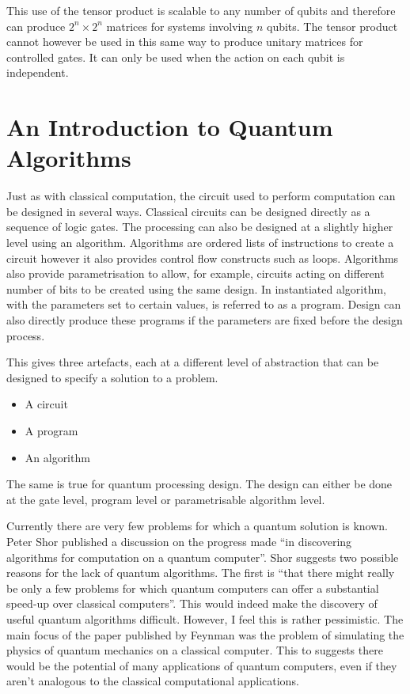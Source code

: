 This use of the tensor product is scalable to any number of qubits and therefore can produce $2^n\times{2^n}$ matrices for systems involving $n$ qubits.
The tensor product cannot however be used in this same way to produce unitary matrices for controlled gates.
It can only be used when the action on each qubit is independent.

\section{An Introduction to Quantum Algorithms}

Just as with classical computation, the circuit used to perform computation can be designed in several ways.
Classical circuits can be designed directly as a sequence of logic gates.
The processing can also be designed at a slightly higher level using an algorithm.
Algorithms are ordered lists of instructions to create a circuit however it also provides control flow constructs such as loops.
Algorithms also provide parametrisation to allow, for example, circuits acting on different number of bits to be created using the same design.
In instantiated algorithm, with the parameters set to certain values, is referred to as a program.
Design can also directly produce these programs if the parameters are fixed before the design process.

This gives three artefacts, each at a different level of abstraction that can be designed to specify a solution to a problem.
\begin{itemize}
 \item A circuit
 \item A program
 \item An algorithm
\end{itemize}

The same is true for quantum processing design.
The design can either be done at the gate level, program level or parametrisable algorithm level.

Currently there are very few problems for which a quantum solution is known.
Peter Shor published a discussion on the progress made ``in discovering algorithms for computation on a quantum computer''\cite{Shor:2004:PQA:1032132.1032149}.
Shor suggests two possible reasons for the lack of quantum algorithms.
The first is ``that there might really be only a few problems for which quantum computers can offer a substantial speed-up over classical computers''\cite{Shor:2004:PQA:1032132.1032149}.
This would indeed make the discovery of useful quantum algorithms difficult.
However, I feel this is rather pessimistic.
The main focus of the paper published by Feynman\cite{Feynman82simulatingphysics} was the problem of simulating the physics of quantum mechanics on a classical computer.
This to suggests there would be the potential of many applications of quantum computers, even if they aren't analogous to the classical computational applications.

